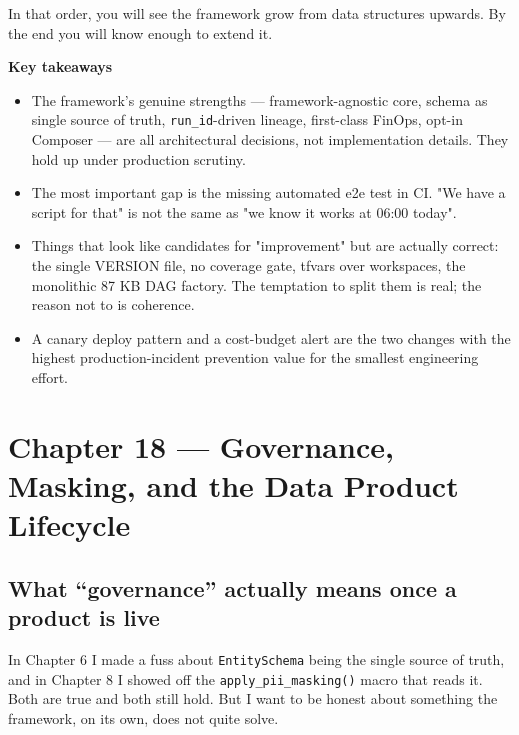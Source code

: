 \documentclass[
  11pt,
  british,
  oneside]{book}
\begin{document}
In that order, you will see the framework grow from data structures
upwards. By the end you will know enough to extend it.

\begin{takeaways}
\textbf{Key takeaways}
\begin{itemize}
  \item The framework's genuine strengths — framework-agnostic core, schema as single source of truth, \texttt{run\_id}-driven lineage, first-class FinOps, opt-in Composer — are all architectural decisions, not implementation details. They hold up under production scrutiny.
  \item The most important gap is the missing automated e2e test in CI. "We have a script for that" is not the same as "we know it works at 06:00 today".
  \item Things that look like candidates for "improvement" but are actually correct: the single VERSION file, no coverage gate, tfvars over workspaces, the monolithic 87 KB DAG factory. The temptation to split them is real; the reason not to is coherence.
  \item A canary deploy pattern and a cost-budget alert are the two changes with the highest production-incident prevention value for the smallest engineering effort.
\end{itemize}
\end{takeaways}

\newpage
\newpage

\hypertarget{chapter-18-governance-masking-and-the-data-product-lifecycle}{%
\chapter{Chapter 18 --- Governance, Masking, and the Data Product
Lifecycle}\label{chapter-18-governance-masking-and-the-data-product-lifecycle}}

\hypertarget{what-governance-actually-means-once-a-product-is-live}{%
\section{What ``governance'' actually means once a product is
live}\label{what-governance-actually-means-once-a-product-is-live}}

In Chapter 6 I made a fuss about \texttt{EntitySchema} being the single
source of truth, and in Chapter 8 I showed off the
\texttt{apply\_pii\_masking()} macro that reads it. Both are true and
both still hold. But I want to be honest about something the framework,
on its own, does not quite solve.
\end{document}
